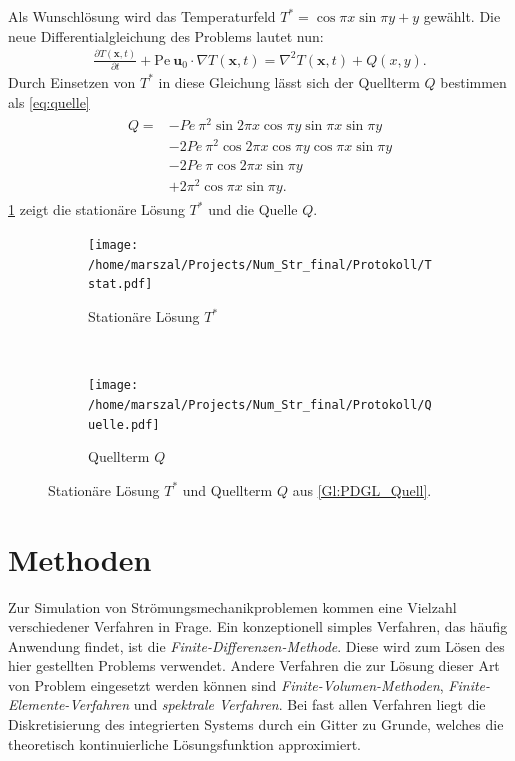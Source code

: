 Als Wunschlösung wird das Temperaturfeld $T^* = \cos{\pi x}\sin{\pi y}+y$ gewählt. Die neue Differentialgleichung des Problems
lautet nun:
\begin{align}
  \frac{\partial T(\boldsymbol x, t)}{\partial t} + \text{Pe}~ \boldsymbol{u}_0\cdot \nabla T(\boldsymbol x, t) = \nabla^2 T(\boldsymbol x, t) + Q(x,y). \label{Gl:PDGL_Quell}
\end{align}
Durch Einsetzen von $T^*$ in diese Gleichung lässt sich der Quellterm $Q$ bestimmen als \cref{eq:quelle}
\begin{align}
  \begin{split}
  Q = &- Pe~ \pi^2 \sin{2 \pi x} \cos{\pi y} \sin{\pi x} \sin{\pi y} \\
   &- 2 Pe~ \pi^2 \cos{2 \pi x} \cos{\pi y} \cos{\pi x} \sin{\pi y}\\
   &- 2 Pe~ \pi \cos{2 \pi x} \sin{\pi y}\\
   &+ 2 \pi^2 \cos{\pi x} \sin{\pi y}.
 \end{split}\label{eq:quelle}
\end{align}
\cref{fig:qtstat} zeigt die stationäre Lösung $T^*$ und die Quelle $Q$.
\begin{figure}
  \centering
  \begin{subfigure}[b]{0.45\textwidth}
  \texttt{[image: /home/marszal/Projects/Num\_Str\_final/Protokoll/Tstat.pdf]}\caption{\centering Stationäre Lösung $T^*$}
  \end{subfigure}
  ~
  \begin{subfigure}[b]{0.45\textwidth}
  \texttt{[image: /home/marszal/Projects/Num\_Str\_final/Protokoll/Quelle.pdf]}\caption{Quellterm $Q$}
\end{subfigure}\caption{Stationäre Lösung $T^*$ und Quellterm $Q$ aus \cref{Gl:PDGL_Quell}.}
  \label{fig:qtstat}
\end{figure}


\section{Methoden}
Zur Simulation von Strömungsmechanikproblemen kommen eine Vielzahl verschiedener Verfahren in Frage.
Ein konzeptionell simples Verfahren, das häufig Anwendung findet, ist die \emph{Finite-Differenzen-Methode}.
Diese wird zum Lösen des hier gestellten Problems verwendet.
Andere Verfahren die zur Lösung dieser Art von Problem eingesetzt werden können sind \emph{Finite-Volumen-Methoden}, \emph{Finite-Elemente-Verfahren} und \emph{spektrale Verfahren}.
Bei fast allen Verfahren liegt die Diskretisierung des integrierten Systems durch ein Gitter zu Grunde, welches die theoretisch kontinuierliche Lösungsfunktion approximiert.
